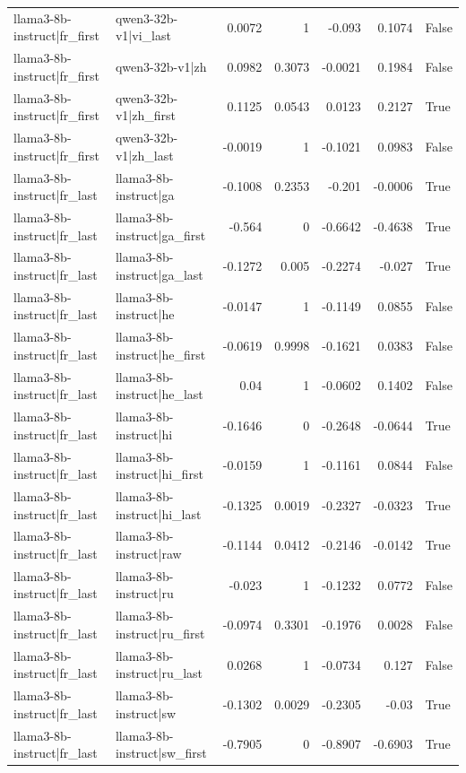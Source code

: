 \begin{table}
\begin{tabular}{l l r r r r l}
llama3-8b-instruct|fr_first & qwen3-32b-v1|vi_last & 0.0072 & 1 & -0.093 & 0.1074 & False \\
llama3-8b-instruct|fr_first & qwen3-32b-v1|zh & 0.0982 & 0.3073 & -0.0021 & 0.1984 & False \\
llama3-8b-instruct|fr_first & qwen3-32b-v1|zh_first & 0.1125 & 0.0543 & 0.0123 & 0.2127 & True \\
llama3-8b-instruct|fr_first & qwen3-32b-v1|zh_last & -0.0019 & 1 & -0.1021 & 0.0983 & False \\
llama3-8b-instruct|fr_last & llama3-8b-instruct|ga & -0.1008 & 0.2353 & -0.201 & -0.0006 & True \\
llama3-8b-instruct|fr_last & llama3-8b-instruct|ga_first & -0.564 & 0 & -0.6642 & -0.4638 & True \\
llama3-8b-instruct|fr_last & llama3-8b-instruct|ga_last & -0.1272 & 0.005 & -0.2274 & -0.027 & True \\
llama3-8b-instruct|fr_last & llama3-8b-instruct|he & -0.0147 & 1 & -0.1149 & 0.0855 & False \\
llama3-8b-instruct|fr_last & llama3-8b-instruct|he_first & -0.0619 & 0.9998 & -0.1621 & 0.0383 & False \\
llama3-8b-instruct|fr_last & llama3-8b-instruct|he_last & 0.04 & 1 & -0.0602 & 0.1402 & False \\
llama3-8b-instruct|fr_last & llama3-8b-instruct|hi & -0.1646 & 0 & -0.2648 & -0.0644 & True \\
llama3-8b-instruct|fr_last & llama3-8b-instruct|hi_first & -0.0159 & 1 & -0.1161 & 0.0844 & False \\
llama3-8b-instruct|fr_last & llama3-8b-instruct|hi_last & -0.1325 & 0.0019 & -0.2327 & -0.0323 & True \\
llama3-8b-instruct|fr_last & llama3-8b-instruct|raw & -0.1144 & 0.0412 & -0.2146 & -0.0142 & True \\
llama3-8b-instruct|fr_last & llama3-8b-instruct|ru & -0.023 & 1 & -0.1232 & 0.0772 & False \\
llama3-8b-instruct|fr_last & llama3-8b-instruct|ru_first & -0.0974 & 0.3301 & -0.1976 & 0.0028 & False \\
llama3-8b-instruct|fr_last & llama3-8b-instruct|ru_last & 0.0268 & 1 & -0.0734 & 0.127 & False \\
llama3-8b-instruct|fr_last & llama3-8b-instruct|sw & -0.1302 & 0.0029 & -0.2305 & -0.03 & True \\
llama3-8b-instruct|fr_last & llama3-8b-instruct|sw_first & -0.7905 & 0 & -0.8907 & -0.6903 & True \\

\end{tabular}
\end{table}
